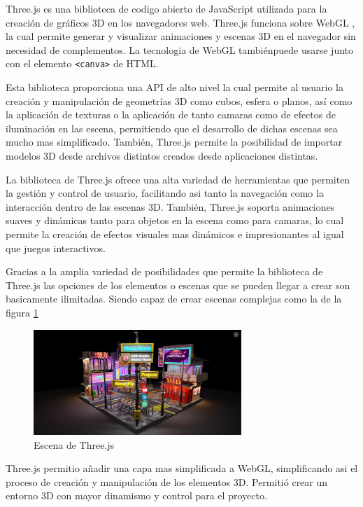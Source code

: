 \documentclass[a4paper, 12pt]{book}
\begin{document}
Three.js \cite{threejs_wikipedia} es una biblioteca de codigo abierto de JavaScript utilizada para la creación de gráficos 3D en los navegadores web. Three.js funciona sobre WebGL \cite{webgl_encodebiz}, la cual permite generar y visualizar animaciones y escenas 3D en el navegador sin necesidad de complementos. La tecnologia de WebGL tambiénpuede usarse junto con el elemento \texttt{<canva>} de HTML.

Esta biblioteca proporciona una API de alto nivel la cual permite al usuario la creación y manipulación de geometrías 3D como cubos, esfera o planos, así como la aplicación de texturas o la aplicación de tanto camaras como de efectos de iluminación en las escena, permitiendo que el desarrollo de dichas escenas sea mucho mas simplificado. 
También, Three.js permite la posibilidad de importar modelos 3D desde archivos distintos creados desde aplicaciones distintas.

La biblioteca de Three.js ofrece una alta variedad de herramientas que permiten la gestión y control de usuario, facilitando asi tanto la navegación como la interacción dentro de las escenas 3D. También, Three.js soporta animaciones suaves y dinámicas tanto para objetos en la escena como para camaras, lo cual permite la creación de efectos visuales mas dinámicos e impresionantes al igual que juegos interactivos. 

Gracias a la amplia variedad de posibilidades que permite la biblioteca de Three.js las opciones de los elementos o escenas que se pueden llegar a crear son basicamente ilimitadas. Siendo capaz de crear escenas complejas como la de la figura \ref{fig:three}
\begin{figure}[H] 
  \centering
  \includegraphics[width=0.7\textwidth]{img/three.jpeg}
  \caption{Escena de Three.js}
  \label{fig:three}
\end{figure}

Three.js permitio añadir una capa mas simplificada a WebGL, simplificando asi el proceso de creación y manipulación de los elementos 3D. Permitió crear un entorno 3D con mayor dinamismo y control para el proyecto.
\end{document}
